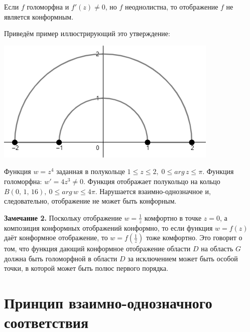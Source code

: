\documentclass[a4paper, 12pt]{report}
\begin{document}
Если \(f\) голоморфна и \(f'(z) \neq 0\), но \(f\) неоднолистна, то отображение \(f\) не является конформным.

Приведём пример иллюстрирующий это утверждение:

\includegraphics[width=6 cm]{conform/example.png}

Функция \(w =z ^ 4\)  заданная в полукольце \(1 \leq z \leq 2, \; 0 \leq arg\,z \leq \pi\). Функция голоморфна: \(w' = 4z^3\neq 0\). Функция отображает полукольцо на кольцо \(B(0,\,1,\,16), \: 0 \leq arg\,w\leq 4\pi\). Нарушается взаимно-однозначное и, следовательно, отображение не может быть конфорным.

\par\bigskip
\textbf{Замечание 2.} \quad Поскольку отображение \(w = \frac{1}{z}\) комфортно в точке \(z = 0\), а композиция конформных отображений конформно, то если функция \(w = f(z)\) даёт конформное отображение, то \(w = f(\frac{1}{z})\) тоже комфортно. Это говорит о том, что функция дающий конформное отображение области \(D\) на область \(G\)  должна быть голоморфной в области \(D\) за исключением может быть особой точки, в которой может быть полюс первого порядка.


\section{Принцип взаимно-однозначного соответствия}
\end{document}
